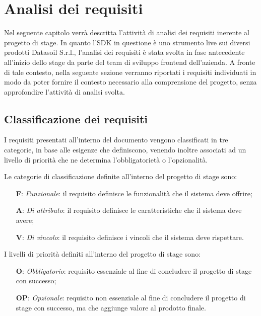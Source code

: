 \chapter{Analisi dei requisiti}
\label{chap:analisi-requisiti}
Nel seguente capitolo verrà descritta l'attività di analisi dei requisiti inerente al progetto di stage. \newline
In quanto l'SDK in questione è uno strumento live sui diversi prodotti Datasoil S.r.l., l'analisi dei requisiti è stata svolta
in fase antecedente all'inizio dello stage da parte del team di sviluppo frontend dell'azienda. \newline
A fronte di tale contesto, nella seguente sezione verranno riportati i requisiti individuati in modo da poter fornire il contesto
necessario alla comprensione del progetto, senza approfondire l'attività di analisi svolta.

\section{Classificazione dei requisiti}
I requisiti presentati all'interno del documento vengono classificati in tre categorie, in base alle esigenze che definiscono, venendo inoltre
associati ad un livello di priorità che ne determina l'obbligatorietà o l'opzionalità. \newline

\newline
Le categorie di classificazione definite all'interno del progetto di stage sono:

\begin{itemize}
    \item[\textbf{F}:] \textit{Funzionale}: il requisito definisce le funzionalità che il sistema deve offrire;
    \item[\textbf{A}:] \textit{Di attributo}: il requisito definisce le caratteristiche che il sistema deve avere;
    \item[\textbf{V}:] \textit{Di vincolo}: il requisito definisce i vincoli che il sistema deve rispettare.
\end{itemize}

\newline
I livelli di priorità definiti all'interno del progetto di stage sono:

\begin{itemize}
    \item[\textbf{O}:] \textit{Obbligatorio}: requisito essenziale al fine di concludere il progetto di stage con successo;
    \item[\textbf{OP}:] \textit{Opzionale}: requisito non essenziale al fine di concludere il progetto di stage con successo, ma che aggiunge valore al prodotto finale.
\end{itemize}


